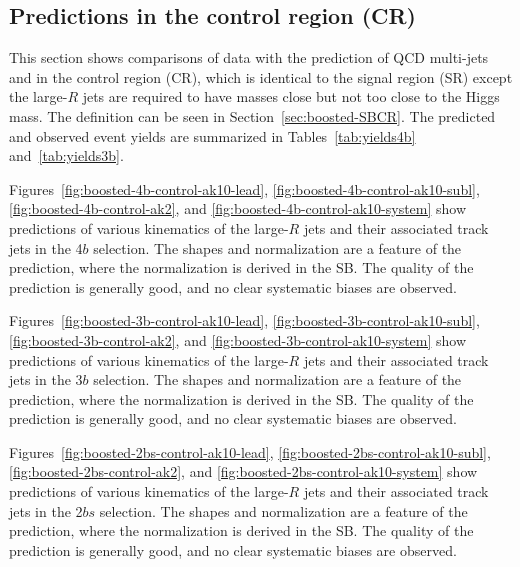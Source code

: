\clearpage


\subsection{Predictions in the control region (CR)}
\label{sec:boosted-cr}

This section shows comparisons of data with the prediction of QCD multi-jets and \ttbar in the control region (CR), which is identical to the signal region (SR) except the large-$R$ jets are required to have masses close but not too close to the Higgs mass. The definition can be seen in Section~\ref{sec:boosted-SBCR}. The predicted and observed event yields are summarized in Tables~\ref{tab:yields4b} and~\ref{tab:yields3b}.

Figures~\ref{fig:boosted-4b-control-ak10-lead}, \ref{fig:boosted-4b-control-ak10-subl}, \ref{fig:boosted-4b-control-ak2}, and \ref{fig:boosted-4b-control-ak10-system} show predictions of various kinematics of the large-$R$ jets and their associated track jets in the 4$b$ selection. The shapes and normalization are a feature of the prediction, where the normalization is derived in the SB. The quality of the prediction is generally good, and no clear systematic biases are observed.

Figures~\ref{fig:boosted-3b-control-ak10-lead}, \ref{fig:boosted-3b-control-ak10-subl}, \ref{fig:boosted-3b-control-ak2},  and \ref{fig:boosted-3b-control-ak10-system} show predictions of various kinematics of the large-$R$ jets and their associated track jets in the 3$b$ selection. The shapes and normalization are a feature of the prediction, where the normalization is derived in the SB. The quality of the prediction is generally good, and no clear systematic biases are observed.

Figures~\ref{fig:boosted-2bs-control-ak10-lead}, \ref{fig:boosted-2bs-control-ak10-subl}, \ref{fig:boosted-2bs-control-ak2},  and \ref{fig:boosted-2bs-control-ak10-system} show predictions of various kinematics of the large-$R$ jets and their associated track jets in the 2$bs$ selection. The shapes and normalization are a feature of the prediction, where the normalization is derived in the SB. The quality of the prediction is generally good, and no clear systematic biases are observed.


